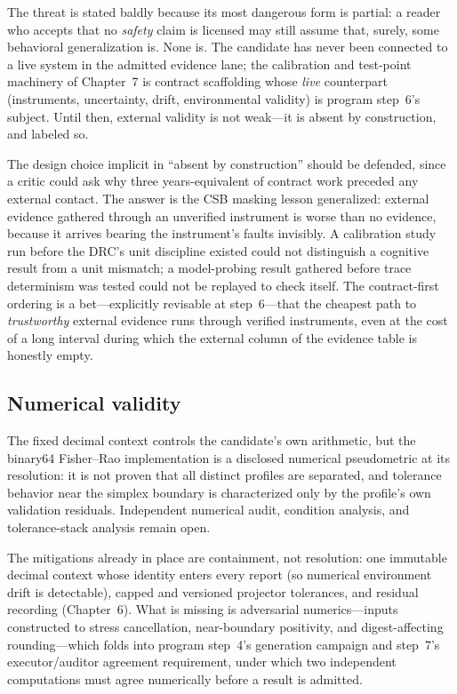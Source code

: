 The threat is stated baldly because its most dangerous form is partial: a reader who accepts that no \emph{safety} claim is licensed may still assume that, surely, some behavioral generalization is. None is. The candidate has never been connected to a live system in the admitted evidence lane; the calibration and test-point machinery of Chapter~7 is contract scaffolding whose \emph{live} counterpart (instruments, uncertainty, drift, environmental validity) is program step~6's subject. Until then, external validity is not weak---it is absent by construction, and labeled so.

The design choice implicit in ``absent by construction'' should be defended, since a critic could ask why three years-equivalent of contract work preceded any external contact. The answer is the CSB masking lesson generalized: external evidence gathered through an unverified instrument is worse than no evidence, because it arrives bearing the instrument's faults invisibly. A calibration study run before the DRC's unit discipline existed could not distinguish a cognitive result from a unit mismatch; a model-probing result gathered before trace determinism was tested could not be replayed to check itself. The contract-first ordering is a bet---explicitly revisable at step~6---that the cheapest path to \emph{trustworthy} external evidence runs through verified instruments, even at the cost of a long interval during which the external column of the evidence table is honestly empty.

\subsection{Numerical validity}\label{ch12:threats-numerical}

\begin{threat}\label{ch12:threat-numerical}
The fixed decimal context controls the candidate's own arithmetic, but the binary64 Fisher--Rao implementation is a disclosed numerical pseudometric at its resolution: it is not proven that all distinct profiles are separated, and tolerance behavior near the simplex boundary is characterized only by the profile's own validation residuals. Independent numerical audit, condition analysis, and tolerance-stack analysis remain open.
\end{threat}

The mitigations already in place are containment, not resolution: one immutable decimal context whose identity enters every report (so numerical environment drift is detectable), capped and versioned projector tolerances, and residual recording (Chapter~6). What is missing is adversarial numerics---inputs constructed to stress cancellation, near-boundary positivity, and digest-affecting rounding---which folds into program step~4's generation campaign and step~7's executor/auditor agreement requirement, under which two independent computations must agree numerically before a result is admitted.

